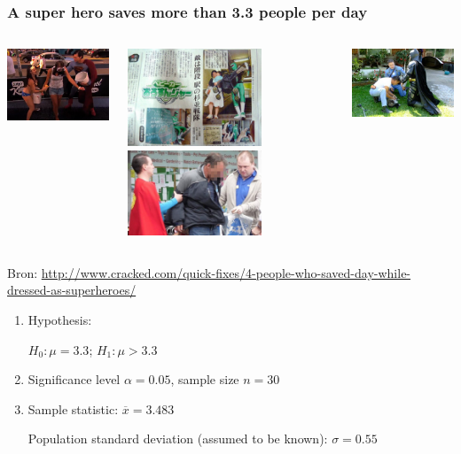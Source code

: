 \documentclass{beamer}
\begin{document}
\begin{frame}
  \frametitle{A super hero saves more than 3.3 people per day}

  \begin{columns}
    \centering
    \includegraphics[width=4cm]{img/les5-gered1}

    \includegraphics[width=4cm]{img/les5-gered2}
    \centering
    \includegraphics[width=4cm]{img/les5-gered3}

    \includegraphics[width=4cm]{img/les5-gered4}
  \end{columns}

  \vfill
  \centering
  \small{Bron: \url{http://www.cracked.com/quick-fixes/4-people-who-saved-day-while-dressed-as-superheroes/}}
\end{frame}

\begin{frame}
  \begin{enumerate}
    \item Hypothesis:
    
    $H_0: \mu = 3.3$; $H_1: \mu > 3.3$
    
    \item Significance level $\alpha = 0.05$, sample size $n = 30$
    
    \item Sample statistic: $\overline{x} = 3.483$
    
    Population standard deviation (assumed to be known): $\sigma = 0.55$
  \end{enumerate}
\end{frame}
\end{document}
